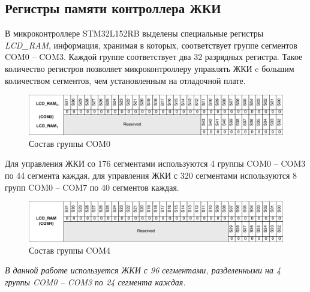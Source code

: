 \subsection{Регистры памяти контроллера ЖКИ}
\label{RegMemLCD}

В микроконтроллере STM32L152RB выделены специальные регистры \textit{LCD\_RAM}, информация, хранимая в которых, соответствует группе сегментов COM0 -- COM3. Каждой группе соответствует два 32 разрядных регистра. Такое количество регистров позволяет микроконтроллеру управлять ЖКИ c большим количеством сегментов, чем установленным на отладочной плате.


\begin{figure}[h!]
\begin{center}
\includegraphics[scale=0.27]{Image/25.jpg}
\end{center}
\caption{Состав группы COM0}\label{COM0}
\end{figure}

Для управления ЖКИ со 176 сегментами используются 4 группы COM0 -- COM3 по 44 сегмента каждая, для управления ЖКИ с 320 сегментами используются 8 групп COM0 -- COM7 по 40 сегментов каждая.

\begin{figure}[h!]
\begin{center}
\includegraphics[scale=0.27]{Image/26.jpg}
\end{center}
\caption{Состав группы COM4}
\end{figure}

\begin{center}
\textit{В данной работе используется ЖКИ с 96 сегментами, разделенными на 4 группы COM0 -- COM3 по 24 сегмента каждая.}
\end{center}

